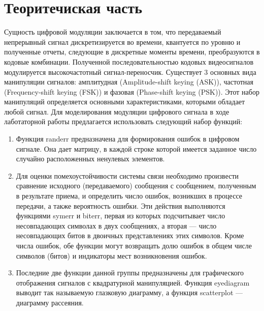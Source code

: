 \documentclass[10pt,a4paper]{report}
\begin{document}
\section{Теоритечиская часть}
Сущность цифровой модуляции заключается в том, что передаваемый непрерывный сигнал дискретизируется во времени, квантуется по уровню и полученные отчеты, следующие в дискретные моменты времени, преобразуются в кодовые комбинации. Полученной последовательностью кодовых видеосигналов модулируется высокочастотный сигнал-переносчик.
Существует 3 основных вида манипуляции сигналов: амплитудная (Amplitude-shift keying (ASK)), частотная (Frequency-shift keying (FSK)) и фазовая (Phase-shift keying (PSK)). Этот набор манипуляций определяется основными характеристиками, которыми обладает любой сигнал. Для моделирования модуляции цифрового сигнала в ходе лаботаторной работы предлагается использовать следующий набор функций:
\begin{enumerate}
\item Функция randerr предназначена для формирования ошибок в цифровом сигнале. Она дает матрицу, в каждой строке которой имеется заданное число случайно расположенных ненулевых элементов.
\item Для оценки помехоустойчивости системы связи необходимо произвести сравнение исходного (передаваемого) сообщения с сообщением, полученным в результате приема, и определить число ошибок, возникших в процессе передачи, а также вероятность ошибки. Эти действия выполняются функциями symerr и biterr, первая из которых подсчитывает число несовпадающих символах в двух сообщениях, а вторая — число несовпадающих битов в двоичных представлениях этих символов. Кроме числа ошибок, обе функции могут возвращать долю ошибок в общем числе символов (битов) и индикаторы мест возникновения ошибок.
\item Последние две функции данной группы предназначены для графического отображения сигналов с квадратурной манипуляцией. Функция eyediagram выводит так называемую глазковую диаграмму, а функция scatterplot — диаграмму рассеяния.
\end{enumerate}
\end{document}
